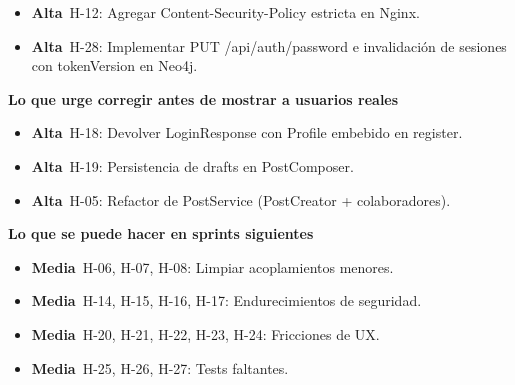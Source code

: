 \documentclass[10pt,a4paper]{article}
\newcommand{\badgeAlta}{\colorbox{orange!20}{\textcolor{orange!90!black}{\textbf{\footnotesize Alta}}}}
\newcommand{\badgeMedia}{\colorbox{yellow!35}{\textcolor{brown!90!black}{\textbf{\footnotesize Media}}}}
\begin{document}
\begin{itemize}[leftmargin=1.5em,noitemsep,topsep=0pt]\item \badgeAlta\  H-12: Agregar Content-Security-Policy estricta en Nginx.\end{itemize}
\begin{itemize}[leftmargin=1.5em,noitemsep,topsep=0pt]\item \badgeAlta\  H-28: Implementar PUT /api/auth/password e invalidación de sesiones con tokenVersion en Neo4j.\end{itemize}
\vspace{0.8em}\noindent\textbf{\large Lo que urge corregir antes de mostrar a usuarios reales}\par\vspace{0.4em}
\begin{itemize}[leftmargin=1.5em,noitemsep,topsep=0pt]\item \badgeAlta\  H-18: Devolver LoginResponse con Profile embebido en register.\end{itemize}
\begin{itemize}[leftmargin=1.5em,noitemsep,topsep=0pt]\item \badgeAlta\  H-19: Persistencia de drafts en PostComposer.\end{itemize}
\begin{itemize}[leftmargin=1.5em,noitemsep,topsep=0pt]\item \badgeAlta\  H-05: Refactor de PostService (PostCreator + colaboradores).\end{itemize}
\vspace{0.8em}\noindent\textbf{\large Lo que se puede hacer en sprints siguientes}\par\vspace{0.4em}
\begin{itemize}[leftmargin=1.5em,noitemsep,topsep=0pt]\item \badgeMedia\  H-06, H-07, H-08: Limpiar acoplamientos menores.\end{itemize}
\begin{itemize}[leftmargin=1.5em,noitemsep,topsep=0pt]\item \badgeMedia\  H-14, H-15, H-16, H-17: Endurecimientos de seguridad.\end{itemize}
\begin{itemize}[leftmargin=1.5em,noitemsep,topsep=0pt]\item \badgeMedia\  H-20, H-21, H-22, H-23, H-24: Fricciones de UX.\end{itemize}
\begin{itemize}[leftmargin=1.5em,noitemsep,topsep=0pt]\item \badgeMedia\  H-25, H-26, H-27: Tests faltantes.\end{itemize}
\end{document}
